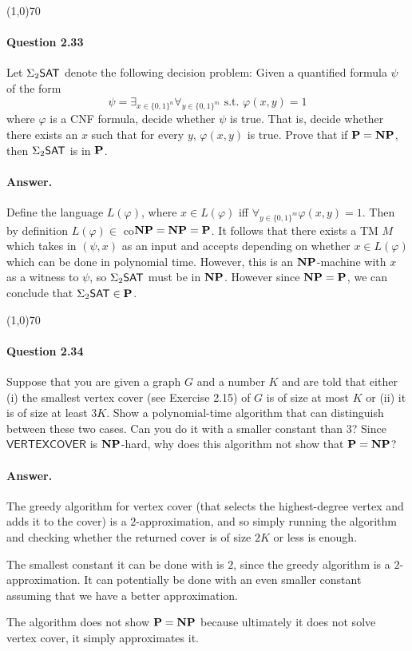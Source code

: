 \begin{center}
	\line(1,0){70}
\end{center}

\paragraph{Question 2.33} Let $\Sigma_2\mathsf{SAT}$ denote the following decision problem: Given a quantified formula $\psi$ of the form
\begin{equation*}
	\psi=\exists_{x\in\{0,1\}^n}\forall_{y\in\{0,1\}^m}\text{ s.t. }\varphi(x,y)=1
\end{equation*}
where $\varphi$ is a CNF formula, decide whether $\psi$ is true. That is, decide whether there exists an $x$ such that for every $y$, $\varphi(x, y)$ is true. Prove that if $\mathbf{P}=\mathbf{NP}$, then $\Sigma_2\mathsf{SAT}$ is in $\mathbf{P}$.

\paragraph{Answer.} Define the language $L(\varphi)$, where $x\in L(\varphi)$ iff $\forall_{y\in\{0,1\}^m}\varphi(x,y)=1$. Then by definition $L(\varphi)\in$ co$\mathbf{NP}=\mathbf{NP}=\mathbf{P}$. It follows that there exists a TM $M$ which takes in $(\psi, x)$ as an input and accepts depending on whether $x\in L(\varphi)$ which can be done in polynomial time. However, this is an $\mathbf{NP}$-machine with $x$ as a witness to $\psi$, so $\Sigma_2\mathsf{SAT}$ must be in $\mathbf{NP}$. However since $\mathbf{NP}=\mathbf{P}$, we can conclude that $\Sigma_2\mathsf{SAT}\in\mathbf{P}$.

\begin{center}
	\line(1,0){70}
\end{center}

\paragraph{Question 2.34} Suppose that you are given a graph $G$ and a number $K$ and are told that either (i) the smallest vertex cover (see Exercise 2.15) of $G$ is of size at most $K$ or (ii) it is of size at least $3K$. Show a polynomial-time algorithm that can distinguish between these two cases. Can you do it with a smaller constant than $3$? Since $\mathsf{VERTEX COVER}$ is $\mathbf{NP}$-hard, why does this algorithm not show that $\mathbf{P}=\mathbf{NP}$?

\paragraph{Answer.} The greedy algorithm for vertex cover (that selects the highest-degree vertex and adds it to the cover) is a $2$-approximation, and so simply running the algorithm and checking whether the returned cover is of size $2K$ or less is enough. 

The smallest constant it can be done with is $2$, since the greedy algorithm is a $2$-approximation. It can potentially be done with an even smaller constant assuming that we have a better approximation.

The algorithm does not show $\mathbf{P}=\mathbf{NP}$ because ultimately it does not solve vertex cover, it simply approximates it.
